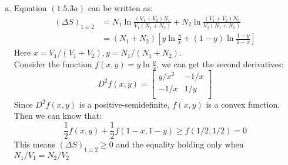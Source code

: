\documentclass{article}
\begin{document}
    \begin{enumerate}[(a)]
        \item   Equation $(1.5.3a)$ can be written as:
                \begin{equation}
                \begin{aligned}
                    \left(\Delta S \right)_{1\equiv 2}&=N_1\ln \frac{(V_1+V_2)N_1}{V_1(N_1+N_2)}+N_2\ln \frac{(V_1+V_2)N_2}{V_2(N_1+N_2)}\\
                                                    &=(N_1+N_2)\left[y\ln \frac{y}{x}+(1-y)\ln\frac{1-y}{1-x}\right]
                \end{aligned}
                \end{equation}
                Here $x=V_1/(V_1+V_2), y=N_1/(N_1+N_2)$.\\

                Consider the function $f(x,y)=y \ln \frac{y}{x}$, we can get the second derivatives:
                \begin{equation}
                    D^2 f(x,y)=\left[
                    \begin{array}{cc}
                        y/x^2 & -1/x \\
                        -1/x & 1/y \\
                    \end{array}\right]
                \end{equation}
                Since $D^2 f(x,y)$ is a positive-semidefinite, $f(x,y)$ is a convex function. Then we can know that:
                \begin{equation}
                    \frac{1}{2} f(x,y)+\frac{1}{2}f(1-x,1-y)\geq f(1/2,1/2)=0
                \end{equation}
                This means $\left(\Delta S \right)_{1\equiv 2}\geq 0$ and the equality holding only when $N_1/V_1=N_2/V_2$


\end{enumerate}
\end{document}
